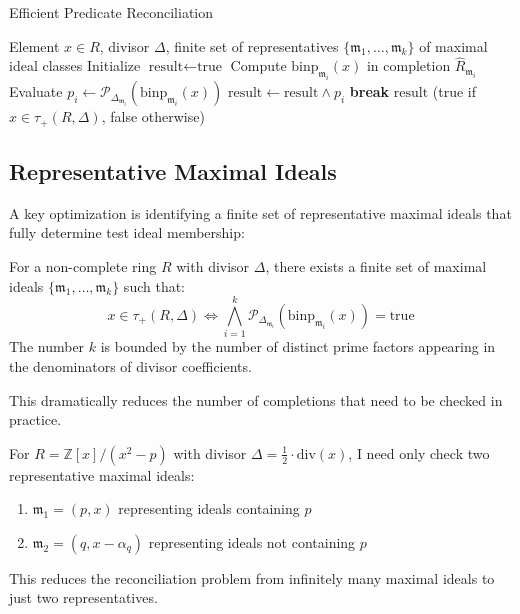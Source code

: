 \begin{algorithm}[H]
\caption{Efficient Predicate Reconciliation}
\label{alg:efficient-reconciliation}
\begin{algorithmic}[1]
\Require Element $x \in R$, divisor $\Delta$, finite set of representatives $\{\mathfrak{m}_1, \ldots, \mathfrak{m}_k\}$ of maximal ideal classes
\State Initialize $\text{result} \gets \text{true}$
    \State Compute $\text{binp}_{\mathfrak{m}_i}(x)$ in completion $\hat{R}_{\mathfrak{m}_i}$
    \State Evaluate $p_i \gets \mathcal{P}_{\Delta_{\mathfrak{m}_i}}(\text{binp}_{\mathfrak{m}_i}(x))$
    \State $\text{result} \gets \text{result} \land p_i$
        \State \textbf{break} 
    \EndIf
\EndFor
\Ensure $\text{result}$ (true if $x \in \tau_+(R,\Delta)$, false otherwise)
\end{algorithmic}
\end{algorithm}

\subsection{Representative Maximal Ideals}

A key optimization is identifying a finite set of representative maximal ideals that fully determine test ideal membership:

\begin{theorem}
For a non-complete ring $R$ with divisor $\Delta$, there exists a finite set of maximal ideals $\{\mathfrak{m}_1, \ldots, \mathfrak{m}_k\}$ such that:
$$x \in \tau_+(R,\Delta) \iff \bigwedge_{i=1}^{k} \mathcal{P}_{\Delta_{\mathfrak{m}_i}}(\text{binp}_{\mathfrak{m}_i}(x)) = \text{true}$$
The number $k$ is bounded by the number of distinct prime factors appearing in the denominators of divisor coefficients.
\end{theorem}

This dramatically reduces the number of completions that need to be checked in practice.

\begin{example}
For $R = \mathbb{Z}[x]/(x^2-p)$ with divisor $\Delta = \frac{1}{2} \cdot \text{div}(x)$, I need only check two representative maximal ideals:
\begin{enumerate}
    \item $\mathfrak{m}_1 = (p, x)$ representing ideals containing $p$
    \item $\mathfrak{m}_2 = (q, x-\alpha_q)$ representing ideals not containing $p$
\end{enumerate}

This reduces the reconciliation problem from infinitely many maximal ideals to just two representatives.
\end{example}

